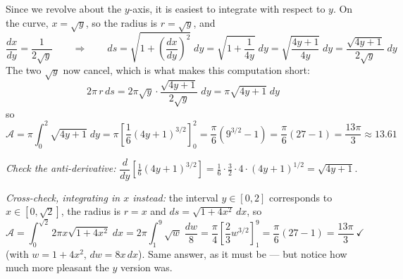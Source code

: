 \documentclass[]{article}
\begin{document}
	Since we revolve about the $y$-axis, it is easiest to integrate with respect to $y$.
	On the curve, $x = \sqrt{y}$, so the radius is $r = \sqrt{y}$, and
	$$
	\frac{dx}{dy} = \frac{1}{2\sqrt{y}}
	\qquad \Longrightarrow \qquad
	ds = \sqrt{1 + \left(\frac{dx}{dy}\right)^2}\;dy = \sqrt{1 + \frac{1}{4y}}\;dy = \sqrt{\frac{4y+1}{4y}}\;dy = \frac{\sqrt{4y+1}}{2\sqrt{y}}\;dy
	$$
	The two $\sqrt{y}$ now cancel, which is what makes this computation short:
	$$
	2\pi \, r \, ds = 2\pi \sqrt{y} \cdot \frac{\sqrt{4y+1}}{2\sqrt{y}}\;dy = \pi\sqrt{4y+1}\;dy
	$$
	so
	$$
	\mathcal{A} = \pi \int_0^2 \sqrt{4y+1}\;dy
	= \pi \left[ \frac{1}{6}\left(4y+1\right)^{3/2} \right]_0^2
	= \frac{\pi}{6}\left( 9^{3/2} - 1 \right)
	= \frac{\pi}{6}\left( 27 - 1 \right)
	= \frac{13\pi}{3} \approx 13.61
	$$

	\textit{Check the anti-derivative:} $\dfrac{d}{dy}\left[\frac{1}{6}(4y+1)^{3/2}\right] = \frac{1}{6}\cdot\frac{3}{2}\cdot 4 \cdot (4y+1)^{1/2} = \sqrt{4y+1}$. \checkmark

	\textit{Cross-check, integrating in $x$ instead:} the interval $y \in [0,2]$ corresponds to $x \in \left[0,\sqrt{2}\right]$, the radius is $r = x$ and $ds = \sqrt{1+4x^2}\,dx$, so
	$$
	\mathcal{A} = \int_0^{\sqrt{2}} 2\pi x \sqrt{1+4x^2}\;dx
	= 2\pi \int_1^{9} \sqrt{w}\;\frac{dw}{8}
	= \frac{\pi}{4}\left[ \frac{2}{3}w^{3/2} \right]_1^{9}
	= \frac{\pi}{6}\left(27 - 1\right)
	= \frac{13\pi}{3} \ \checkmark
	$$
	(with $w = 1+4x^2$, $dw = 8x\,dx$).
	Same answer, as it must be --- but notice how much more pleasant the $y$ version was.
\end{document}
